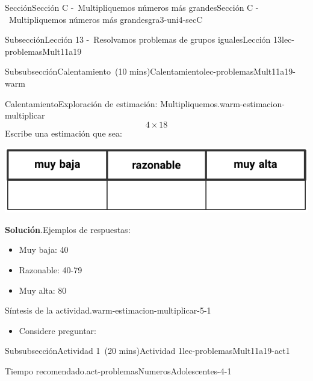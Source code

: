 \documentclass[oneside,10pt,]{article}
\newcommand{\blocktitlefont}{\relax}
\newlength{\fillinmaxwidth}
\newlength{\fillincontract}
\newlength{\charmaxwidth}\setlength{\charmaxwidth}{0.5em}
\newlength{\charminwidth}\setlength{\charminwidth}{0.1em}
\newlength{\fillinheight}
\newcommand{\fillintext}[1]{%
\setlength{\fillinmaxwidth}{#1\charmaxwidth}%
\setlength{\fillincontract}{#1\charminwidth}%
\setlength{\fillinheight}{\baselineskip}\addtolength{\fillinheight}{1.2pt}%
\strut\nobreak\leaders\vbox{\hrule width 0.3pt height 0.3pt \vskip -1.2pt}\hskip 1\fillinmaxwidth minus \fillincontract\nobreak\strut%
}
\begin{document}
\begin{sectionptx}{Sección}{Sección C -~Multipliquemos números más grandes}{}{Sección C -~Multipliquemos números más grandes}{}{}{gra3-uni4-secC}
\begin{subsectionptx}{Subsección}{Lección 13 -~Resolvamos problemas de grupos iguales}{}{Lección 13}{}{}{lec-problemasMult11a19}
\begin{subsubsectionptx}{Subsubsección}{Calentamiento~(10 mins)}{}{Calentamiento}{}{}{lec-problemasMult11a19-warm}
\begin{exploration}{Calentamiento}{Exploración de estimación: Multipliquemos.}{warm-estimacion-multiplicar}
%
\begin{equation*}
4\times 18
\end{equation*}
Escribe una estimación que sea:%
\begin{image}{0}{1}{0}{}%
\includegraphics[width=\linewidth]{external/tikz-source/expolacionEstimacion-tab-prof.pdf}
\end{image}%
\par\smallskip%
\noindent\textbf{\blocktitlefont Solución}.\hypertarget{warm-estimacion-multiplicar-3}{}\quad{}Ejemplos de respuestas:%
%
\begin{itemize}[label=\textbullet]
\item{}Muy baja: 40%
\item{}Razonable: 40-79%
\item{}Muy alta: 80%
\end{itemize}
\end{exploration}%
\par
\begin{paragraphs}{Síntesis de la actividad.}{warm-estimacion-multiplicar-5-1}%
%
\begin{itemize}[label=\textbullet]
\item{}Considere preguntar:%
%
\end{itemize}
\end{paragraphs}%
\end{subsubsectionptx}
%
%
\typeout{************************************************}
\typeout{************************************************}
%
\begin{subsubsectionptx}{Subsubsección}{Actividad 1~(20 mins)}{}{Actividad 1}{}{}{lec-problemasMult11a19-act1}
\par
\begin{paragraphs}{Tiempo recomendado.}{act-problemasNumerosAdolescentes-4-1}%

\end{paragraphs}
\end{subsubsectionptx}
\end{subsectionptx}
\end{sectionptx}
\end{document}

